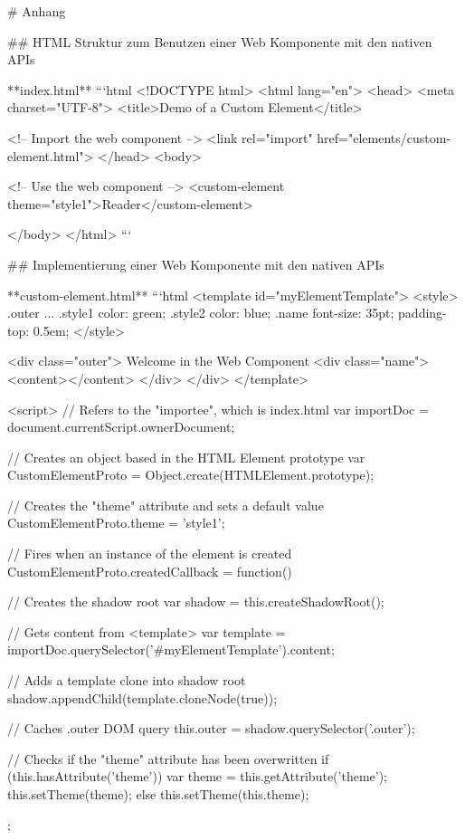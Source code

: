 # Anhang

## HTML Struktur zum Benutzen einer Web Komponente mit den nativen APIs

**index.html**
```html
<!DOCTYPE html>
<html lang="en">
<head>
  <meta charset="UTF-8">
  <title>Demo of a Custom Element</title>

  <!-- Import the web component -->
  <link rel="import" href="elements/custom-element.html">
</head>
<body>

  <!-- Use the web component -->
  <custom-element theme="style1">Reader</custom-element>

</body>
</html>
```


## Implementierung einer Web Komponente mit den nativen APIs

**custom-element.html**
```html
<template id="myElementTemplate">
  <style>
    .outer { ... }
    .style1 { color: green; }
    .style2 { color: blue; }
    .name { font-size: 35pt; padding-top: 0.5em; }
  </style>

  <div class="outer">
    Welcome in the Web Component
    <div class="name">
      <content></content>
    </div>
  </div>
</template>

<script>
  // Refers to the "importee", which is index.html
  var importDoc = document.currentScript.ownerDocument;

  // Creates an object based in the HTML Element prototype
  var CustomElementProto = Object.create(HTMLElement.prototype);

  // Creates the "theme" attribute and sets a default value
  CustomElementProto.theme = 'style1';

  // Fires when an instance of the element is created
  CustomElementProto.createdCallback = function() {

    // Creates the shadow root
    var shadow = this.createShadowRoot();

    // Gets content from <template>
    var template = importDoc.querySelector('#myElementTemplate').content;

    // Adds a template clone into shadow root
    shadow.appendChild(template.cloneNode(true));

    // Caches .outer DOM query
    this.outer = shadow.querySelector('.outer');

    // Checks if the "theme" attribute has been overwritten
    if (this.hasAttribute('theme')) {
      var theme = this.getAttribute('theme');
      this.setTheme(theme);
    } else {
      this.setTheme(this.theme);
    }
  };


